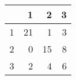 \begin{tabular}{rrrr}
  \hline
 & 1 & 2 & 3 \\ 
  \hline
1 &  21 &   1 &   3 \\ 
  2 &   0 &  15 &   8 \\ 
  3 &   2 &   4 &   6 \\ 
   \hline
\end{tabular}
